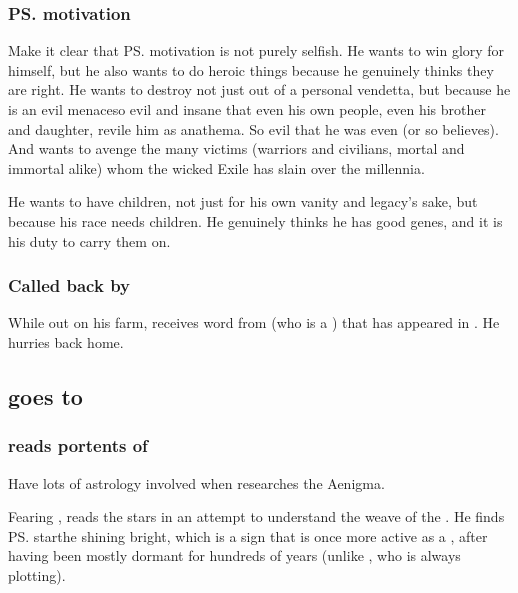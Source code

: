 \subsubsection{\ps{\Teshrial} motivation}
Make it clear that \ps{\Teshrial} motivation is not purely selfish. 
He wants to win glory for himself, but he also wants to do heroic things because he genuinely thinks they are right. 
He wants to destroy \Ishnaruchaefir{} not just out of a personal vendetta, but because he is an evil menace\dash so evil and insane that even his own people, even his brother and daughter, revile him as anathema. 
So evil that he was even  (or so \Teshrial{} believes). 
And \Teshrial{} wants to avenge the many victims (warriors and civilians, mortal and immortal alike) whom the wicked Exile has slain over the millennia. 

He wants to have children, not just for his own vanity and legacy's sake, but because his race needs children. 
He genuinely thinks he has good genes, and it is his duty to carry them on. 





\subsubsection{Called back by \Achsah}
While out on his farm, \Teshrial{} receives word from \Achsah{} (who is a ) that \Ishnaruchaefir{} has appeared in \Malcur. 
He hurries back home. 









\subsection{\Teshrial goes to \Urizeth}
\subsubsection{\Teshrial{} reads portents of \Ishnaruchaefir}
Have lots of astrology involved when \Teshrial{} researches the Aenigma. 

Fearing \Ishnaruchaefir, \Teshrial{} reads the stars in an attempt to understand the weave of the \matrices. 
He finds \ps{\Ishnaruchaefir} star\dash the \dash shining bright, which is a sign that \Ishnaruchaefir{} is once more active as a \vertex, after having been mostly dormant for hundreds of years (unlike \Secherdamon, who is always plotting). 

